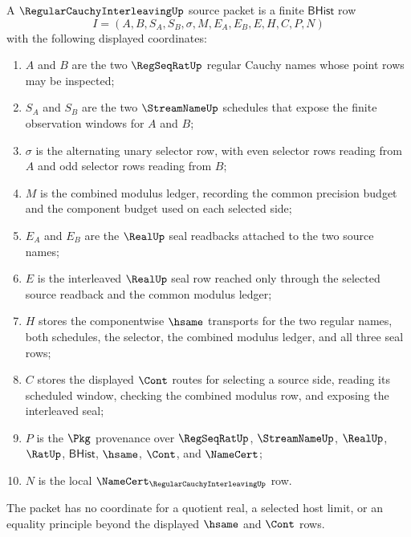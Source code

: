 \begin{definition}
\label{def:regular-cauchy-interleaving-source}
A $\RegularCauchyInterleavingUp$ source packet is a finite $\mathsf{BHist}$ row
$$
I=(A,B,S_A,S_B,\sigma,M,E_A,E_B,E,H,C,P,N)
$$
with the following displayed coordinates:
\begin{enumerate}
\item $A$ and $B$ are the two $\RegSeqRatUp$ regular Cauchy names whose point rows may be inspected;
\item $S_A$ and $S_B$ are the two $\StreamNameUp$ schedules that expose the finite observation windows for $A$ and $B$;
\item $\sigma$ is the alternating unary selector row, with even selector rows reading from $A$ and odd selector rows reading from $B$;
\item $M$ is the combined modulus ledger, recording the common precision budget and the component budget used on each selected side;
\item $E_A$ and $E_B$ are the $\RealUp$ seal readbacks attached to the two source names;
\item $E$ is the interleaved $\RealUp$ seal row reached only through the selected source readback and the common modulus ledger;
\item $H$ stores the componentwise $\hsame$ transports for the two regular names, both schedules, the selector, the combined modulus ledger, and all three seal rows;
\item $C$ stores the displayed $\Cont$ routes for selecting a source side, reading its scheduled window, checking the combined modulus row, and exposing the interleaved seal;
\item $P$ is the $\Pkg$ provenance over $\RegSeqRatUp$, $\StreamNameUp$, $\RealUp$, $\RatUp$, $\mathsf{BHist}$, $\hsame$, $\Cont$, and $\NameCert$;
\item $N$ is the local $\NameCert_{\RegularCauchyInterleavingUp}$ row.
\end{enumerate}
The packet has no coordinate for a quotient real, a selected host limit, or an equality principle beyond the displayed $\hsame$ and $\Cont$ rows.
\end{definition}

